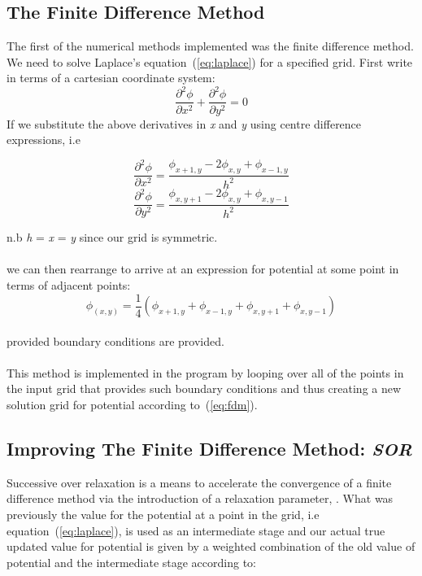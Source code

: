 \documentclass{article}
\begin{document}
\subsection{The Finite Difference Method}
The first of the numerical methods implemented was the finite difference method. We need to solve Laplace's equation~(\ref{eq:laplace}) for a specified grid. First write in terms of a cartesian coordinate system:  
\begin{equation}
\frac{\partial^2\phi}{\partial x^2}+\frac{\partial^2\phi}{\partial y^2}=0
\label{eq:lapcart}
\end{equation}  
If we substitute the above derivatives in \textit{x} and \textit{y} using centre difference expressions, i.e
\begin{multicols}{2}
  \begin{equation}
\frac{\partial^2\phi}{\partial x^2} = \frac{\phi_{x+1,y}-2\phi_{x,y}+\phi_{x-1, y}}{h^2}
  \end{equation}\break
  \begin{equation}
\frac{\partial^2\phi}{\partial y^2} = \frac{\phi_{x,y+1}-2\phi_{x,y}+\phi_{x, y-1}}{h^2}
  \end{equation}
\end{multicols}
 n.b \textit{h} = \Delta\)\textit{x} = \Delta\textit{y}\) since our grid is symmetric.\\
\\
we can then rearrange to arrive at an expression for potential at some point in terms of adjacent points:
\begin{equation}
\phi_(x,y) = \frac{1}{4}(\phi_{x+1,y}+\phi_{x-1,y}+\phi_{x,y+1} + \phi_{x, y-1})
\label{eq:fdm}
\end{equation}
\\
provided boundary conditions are provided. \\
 \\
This method is implemented in the program by looping over all of the points in the input grid that provides such boundary conditions and thus creating a new solution grid for potential according to~(\ref{eq:fdm}). 

\subsection{Improving The Finite Difference Method: \textit{SOR}}
Successive over relaxation is a means to accelerate the convergence of a finite difference method via the introduction of a relaxation parameter, \omega\). 
What was previously the value for the potential at a point in the grid, i.e equation~(\ref{eq:laplace}), is used as an intermediate stage and our actual true updated value for potential is given by a weighted combination of the old value of potential and the intermediate stage according to: \\
\end{document}
